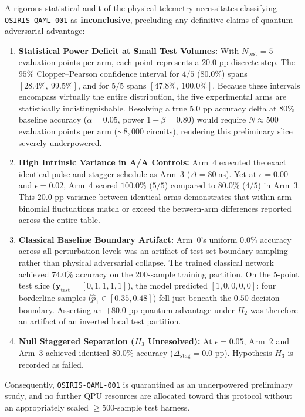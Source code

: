 \documentclass[aps,preprint,superscriptaddress,longbibliography]{revtex4-2}
\begin{document}
A rigorous statistical audit of the physical telemetry necessitates classifying \texttt{OSIRIS-QAML-001} as \textbf{inconclusive}, precluding any definitive claims of quantum adversarial advantage:
\begin{enumerate}
\item \textbf{Statistical Power Deficit at Small Test Volumes:} With $N_{\mathrm{test}} = 5$ evaluation points per arm, each point represents a $20.0\text{ pp}$ discrete step. The $95\%$ Clopper--Pearson confidence interval for $4/5$ ($80.0\%$) spans $[28.4\%,\ 99.5\%]$, and for $5/5$ spans $[47.8\%,\ 100.0\%]$. Because these intervals encompass virtually the entire distribution, the five experimental arms are statistically indistinguishable. Resolving a true $5.0\text{ pp}$ accuracy delta at $80\%$ baseline accuracy ($\alpha = 0.05$, power $1 - \beta = 0.80$) would require $N \approx 500$ evaluation points per arm ($\sim 8{,}000$ circuits), rendering this preliminary slice severely underpowered.
\item \textbf{High Intrinsic Variance in A/A Controls:} Arm~4 executed the exact identical pulse and stagger schedule as Arm~3 ($\Delta = \SI{80}{\nano\second}$). Yet at $\epsilon = 0.00$ and $\epsilon = 0.02$, Arm~4 scored $100.0\%$ ($5/5$) compared to $80.0\%$ ($4/5$) in Arm~3. This $20.0\text{ pp}$ variance between identical arms demonstrates that within-arm binomial fluctuations match or exceed the between-arm differences reported across the entire table.
\item \textbf{Classical Baseline Boundary Artifact:} Arm~0's uniform $0.0\%$ accuracy across all perturbation levels was an artifact of test-set boundary sampling rather than physical adversarial collapse. The trained classical network achieved $74.0\%$ accuracy on the 200-sample training partition. On the 5-point test slice ($\mathbf{y}_{\mathrm{test}} = [0, 1, 1, 1, 1]$), the model predicted $[1, 0, 0, 0, 0]$: four borderline samples ($\hat{p}_1 \in [0.35, 0.48]$) fell just beneath the $0.50$ decision boundary. Asserting an $+80.0\text{ pp}$ quantum advantage under $H_2$ was therefore an artifact of an inverted local test partition.
\item \textbf{Null Staggered Separation ($H_3$ Unresolved):} At $\epsilon = 0.05$, Arm~2 and Arm~3 achieved identical $80.0\%$ accuracy ($\Delta_{\mathrm{stag}} = 0.0\text{ pp}$). Hypothesis $H_3$ is recorded as failed.
\end{enumerate}
Consequently, \texttt{OSIRIS-QAML-001} is quarantined as an underpowered preliminary study, and no further QPU resources are allocated toward this protocol without an appropriately scaled $\ge 500$-sample test harness.
\end{document}
